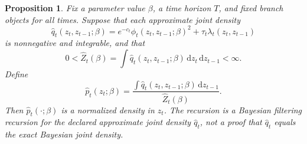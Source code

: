 \documentclass[11pt]{article}
\newtheorem{proposition}{Proposition}
\numberwithin{equation}{section}
\newcommand{\dd}{\,\mathrm d}
\begin{document}
\begin{proposition}
Fix a parameter value \(\beta\), a time horizon \(T\), and fixed branch objects
for all times.  Suppose that each approximate joint density
\begin{equation}
    \widehat q_t(z_t,z_{t-1};\beta)
    =
    e^{-c_t}\phi_t(z_t,z_{t-1};\beta)^2
    +
    \tau_t\lambda_t(z_t,z_{t-1})
    \label{eq:p24-p19-77}
\end{equation}
is nonnegative and integrable, and that
\begin{equation}
    0<\widehat Z_t(\beta)
    =
    \int \widehat q_t(z_t,z_{t-1};\beta)\dd z_t\dd z_{t-1}
    <\infty.
    \label{eq:p24-p19-78}
\end{equation}
Define
\begin{equation}
    \widehat p_t(z_t;\beta)
    =
    \frac{\int \widehat q_t(z_t,z_{t-1};\beta)\dd z_{t-1}}
    {\widehat Z_t(\beta)}.
    \label{eq:p24-p19-79}
\end{equation}
Then \(\widehat p_t(\cdot;\beta)\) is a normalized density in \(z_t\).  The
recursion is a Bayesian filtering recursion for the declared approximate joint
density \(\widehat q_t\), not a proof that \(\widehat q_t\) equals the exact
Bayesian joint density.
\end{proposition}
\end{document}
